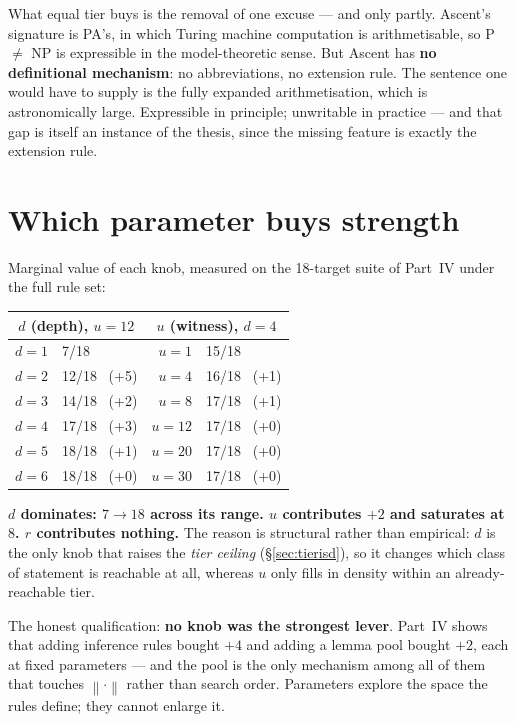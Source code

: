 \documentclass[11pt,a4paper]{article}
\newcommand{\shortest}[1]{\left\lVert #1 \right\rVert}
\begin{document}
What equal tier buys is the removal of one excuse --- and only partly. Ascent's
signature is PA's, in which Turing machine computation is arithmetisable, so
P $\neq$ NP is expressible in the model-theoretic sense. But Ascent has
\textbf{no definitional mechanism}: no abbreviations, no extension rule. The
sentence one would have to supply is the fully expanded arithmetisation, which
is astronomically large. Expressible in principle; unwritable in practice ---
and that gap is itself an instance of the thesis, since the missing feature is
exactly the extension rule.

\section{Which parameter buys strength}\label{sec:whichparam}

Marginal value of each knob, measured on the 18-target suite of Part~IV under
the full rule set:

\begin{center}
\begin{tabular}{@{}rlrl@{}}
\toprule
\multicolumn{2}{c}{$d$ (depth), $u=12$} & \multicolumn{2}{c}{$u$ (witness), $d=4$} \\
\midrule
$d=1$ & 7/18          & $u=1$  & 15/18 \\
$d=2$ & 12/18 \ (+5)  & $u=4$  & 16/18 \ (+1) \\
$d=3$ & 14/18 \ (+2)  & $u=8$  & 17/18 \ (+1) \\
$d=4$ & 17/18 \ (+3)  & $u=12$ & 17/18 \ (+0) \\
$d=5$ & 18/18 \ (+1)  & $u=20$ & 17/18 \ (+0) \\
$d=6$ & 18/18 \ (+0)  & $u=30$ & 17/18 \ (+0) \\
\bottomrule
\end{tabular}
\end{center}

\textbf{$d$ dominates: $7 \to 18$ across its range. $u$ contributes $+2$ and
saturates at $8$. $r$ contributes nothing.} The reason is structural rather
than empirical: $d$ is the only knob that raises the \emph{tier ceiling}
(\S\ref{sec:tierisd}), so it changes which class of statement is reachable at
all, whereas $u$ only fills in density within an already-reachable tier.

The honest qualification: \textbf{no knob was the strongest lever}. Part~IV
shows that adding inference rules bought $+4$ and adding a lemma pool bought
$+2$, each at fixed parameters --- and the pool is the only mechanism among all
of them that touches $\shortest{\cdot}$ rather than search order. Parameters
explore the space the rules define; they cannot enlarge it.
\end{document}
